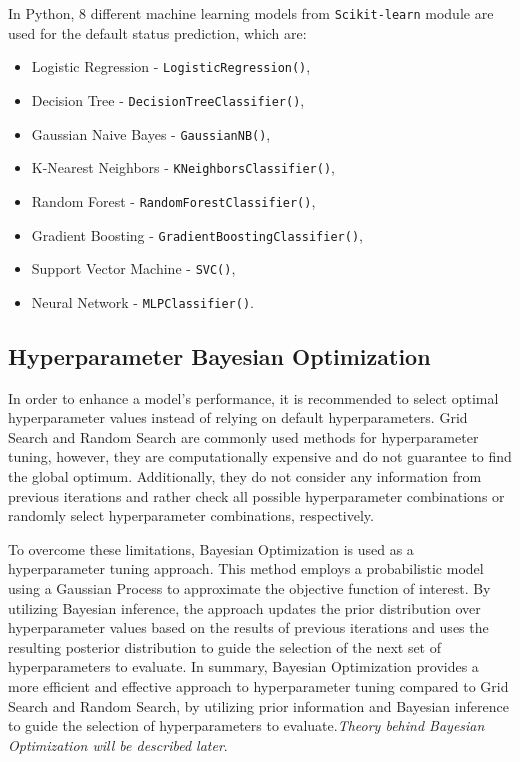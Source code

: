         In Python, 8 different machine learning models from \lstinline{Scikit-learn} module are used for the default status prediction, which are:
        \begin{itemize}\setlength\itemsep{0em}
            \item Logistic Regression - \lstinline{LogisticRegression()},
            \item Decision Tree - \lstinline{DecisionTreeClassifier()},
            \item Gaussian Naive Bayes - \lstinline{GaussianNB()},
            \item K-Nearest Neighbors - \lstinline{KNeighborsClassifier()},
            \item Random Forest - \lstinline{RandomForestClassifier()},
            \item Gradient Boosting - \lstinline{GradientBoostingClassifier()},
            \item Support Vector Machine - \lstinline{SVC()},
            \item Neural Network - \lstinline{MLPClassifier()}.
        \end{itemize}
        
        \subsection{Hyperparameter Bayesian Optimization}
        
        In order to enhance a model's performance, it is recommended to select optimal hyperparameter values instead of relying on default hyperparameters.
        Grid Search and Random Search are commonly used methods for hyperparameter tuning, however, they are computationally expensive and do not guarantee to find the global optimum.
        Additionally, they do not consider any information from previous iterations and rather check all possible hyperparameter combinations or randomly select hyperparameter combinations, respectively.
        
        To overcome these limitations, Bayesian Optimization is used as a hyperparameter tuning approach.
        This method employs a probabilistic model using a Gaussian Process to approximate the objective function of interest.
        By utilizing Bayesian inference, the approach updates the prior distribution over hyperparameter values based on the results of previous iterations and uses the resulting posterior distribution to guide the selection of the next set of hyperparameters to evaluate.
        In summary, Bayesian Optimization provides a more efficient and effective approach to hyperparameter tuning compared to Grid Search and Random Search, by utilizing prior information and Bayesian inference to guide the selection of hyperparameters to evaluate.\textit{Theory behind Bayesian Optimization will be described later}.
        
